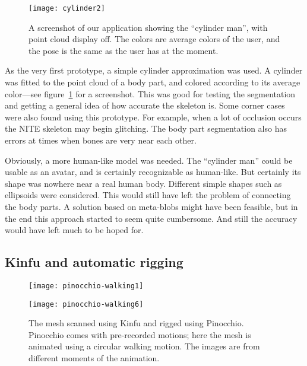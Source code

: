 \begin{figure}
    \centering
    \texttt{[image: cylinder2]}
    \caption{A screenshot of our application showing the ``cylinder man'', with point cloud display off. The colors are average colors of the user, and the pose is the same as the user has at the moment.}
    \label{fig:cylinders}
\end{figure}


As the very first prototype, a simple cylinder approximation was used. A cylinder was fitted to the point cloud of a body part, and colored according to its average color---see figure~\ref{fig:cylinders} for a screenshot. This was good for testing the segmentation and getting a general idea of how accurate the skeleton is. Some corner cases were also found using this prototype. For example, when a lot of occlusion occurs the NITE skeleton may begin glitching. The body part segmentation also has errors at times when bones are very near each other.

Obviously, a more human-like model was needed. The ``cylinder man'' could be usable as an avatar, and is certainly recognizable as human-like. But certainly its shape was nowhere near a real human body. Different simple shapes such as ellipsoids were considered. This would still have left the problem of connecting the body parts. A solution based on meta-blobs might have been feasible, but in the end this approach started to seem quite cumbersome. And still the accuracy would have left much to be hoped for.


\subsection{Kinfu and automatic rigging} \label{approach.autorig}

\begin{figure}
    \centering
    \begin{minipage}{0.49\textwidth}
        \texttt{[image: pinocchio-walking1]}
    \end{minipage}
    \begin{minipage}{0.49\textwidth}
        \texttt{[image: pinocchio-walking6]}
    \end{minipage}
    \caption{The mesh scanned using Kinfu and rigged using Pinocchio. Pinocchio comes with pre-recorded motions; here the mesh is animated using a circular walking motion. The images are from different moments of the animation.}
    \label{fig:hannu-front}
\end{figure}

